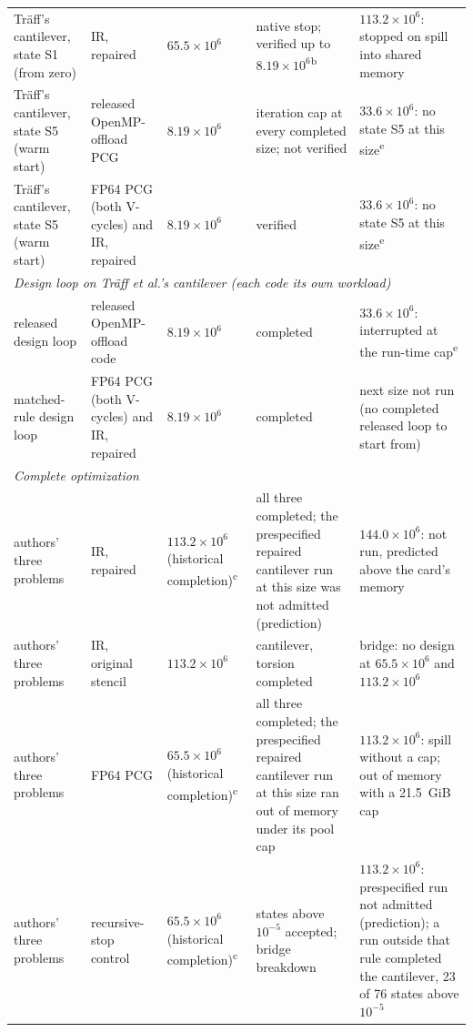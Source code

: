 \begin{tabular}{lllll}
Tr\"aff's cantilever, state S1 (from zero) & IR, repaired & $65.5\times10^{6}$ & native stop; verified up to $8.19\times10^{6}$\textsuperscript{b} & $113.2\times10^{6}$: stopped on spill into shared memory \\
Tr\"aff's cantilever, state S5 (warm start) & released OpenMP-offload PCG & $8.19\times10^{6}$ & iteration cap at every completed size; not verified & $33.6\times10^{6}$: no state S5 at this size\textsuperscript{e} \\
Tr\"aff's cantilever, state S5 (warm start) & FP64 PCG (both V-cycles) and IR, repaired & $8.19\times10^{6}$ & verified & $33.6\times10^{6}$: no state S5 at this size\textsuperscript{e} \\
\midrule
\multicolumn{5}{l}{\emph{Design loop on Tr\"aff et al.'s cantilever (each code its own workload)}} \\
released design loop & released OpenMP-offload code & $8.19\times10^{6}$ & completed & $33.6\times10^{6}$: interrupted at the run-time cap\textsuperscript{e} \\
matched-rule design loop & FP64 PCG (both V-cycles) and IR, repaired & $8.19\times10^{6}$ & completed & next size not run (no completed released loop to start from) \\
\midrule
\multicolumn{5}{l}{\emph{Complete optimization}} \\
authors' three problems & IR, repaired & $113.2\times10^{6}$ (historical completion)\textsuperscript{c} & all three completed; the prespecified repaired cantilever run at this size was not admitted (prediction) & $144.0\times10^{6}$: not run, predicted above the card's memory \\
authors' three problems & IR, original stencil & $113.2\times10^{6}$ & cantilever, torsion completed & bridge: no design at $65.5\times10^{6}$ and $113.2\times10^{6}$ \\
authors' three problems & FP64 PCG & $65.5\times10^{6}$ (historical completion)\textsuperscript{c} & all three completed; the prespecified repaired cantilever run at this size ran out of memory under its pool cap & $113.2\times10^{6}$: spill without a cap; out of memory with a 21.5~GiB cap \\
authors' three problems & recursive-stop control & $65.5\times10^{6}$ (historical completion)\textsuperscript{c} & states above $10^{-5}$ accepted; bridge breakdown & $113.2\times10^{6}$: prespecified run not admitted (prediction); a run outside that rule completed the cantilever, 23 of 76 states above $10^{-5}$ \\
\bottomrule
\end{tabular}
